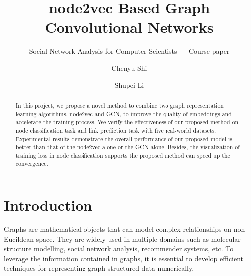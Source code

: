 \documentclass[sigconf]{acmart}
\begin{document}
\title{node2vec Based Graph Convolutional Networks}
\subtitle{ Social Network Analysis for Computer Scientists --- Course paper} %

\author{Chenyu Shi}

\author{Shupei Li}

\renewcommand{\shortauthors}{Shi and Li}


\begin{abstract}

In this project, we propose a novel method to combine two graph representation learning algorithms, node2vec and GCN, to improve the quality of embeddings and accelerate the training process. We verify the effectiveness of our proposed method on node classification task and link prediction task with five real-world datasets. Experimental results demonstrate the overall performance of our proposed model is better than that of the node2vec alone or the GCN alone. Besides, the visualization of training loss in node classification supports the proposed method can speed up the convergence.

\end{abstract}

\maketitle

\section{Introduction}
Graphs are mathematical objects that can model complex relationships on non-Eucildean space. They are widely used in multiple domains such as molecular structure modelling, social network analysis, recommender systems, etc. To leverage the information contained in graphs, it is essential to develop efficient techniques for representing graph-structured data numerically.\par
\end{document}
